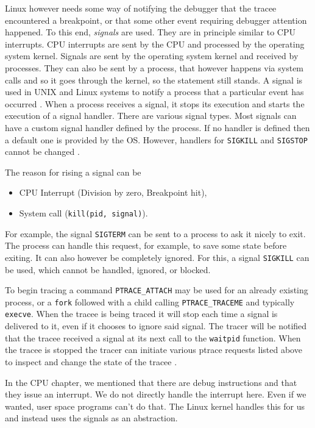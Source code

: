 Linux however needs some way of notifying the debugger that the tracee
encountered a breakpoint, or that some other event requiring debugger attention
happened. To this end, \textit{signals} are used. They are in principle similar
to CPU interrupts. CPU interrupts are sent by the CPU and processed by the
operating system kernel. Signals are sent by the operating system kernel and
received by processes. They can also be sent by a process, that however happens
via system calls and so it goes through the kernel, so the statement still
stands. A signal is used in UNIX and Linux systems to notify a process that a
particular event has occurred \cite{os-concepts}.  When a process receives a
signal, it stops its execution and starts the execution of a signal handler.
There are various signal types. Most signals can have a custom signal handler
defined by the process. If no handler is defined then a default one is provided
by the OS. However, handlers for \texttt{SIGKILL} and \texttt{SIGSTOP} cannot
be changed \cite{signals}.

The reason for rising a signal can be 
\begin{itemize}
    \item CPU Interrupt (Division by zero, Breakpoint hit),
    \item System call (\texttt{kill(pid, signal)}).
\end{itemize}

For example, the signal \texttt{SIGTERM} can be sent to a process to ask it
nicely to exit. The process can handle this request, for example, to save some
state before exiting. It can also however be completely ignored. For this, a
signal \texttt{SIGKILL} can be used, which cannot be handled, ignored, or
blocked.

To begin tracing a command \texttt{PTRACE\_ATTACH} may be used for an already
existing process, or a \texttt{fork} followed with a child calling
\texttt{PTRACE\_TRACEME} and typically \texttt{execve}. When the tracee is
being traced it will stop each time a signal is delivered to it, even if it
chooses to ignore said signal. The tracer will be notified that the tracee
received a signal at its next call to the \texttt{waitpid} function. When the
tracee is stopped the tracer can initiate various ptrace requests listed above
to inspect and change the state of the tracee \cite{ptrace}.

In the CPU chapter, we mentioned that there are debug instructions and that
they issue an interrupt. We do not directly handle the interrupt here. Even if
we wanted, user space programs can't do that. The Linux kernel handles this for
us and instead uses the signals as an abstraction. 

